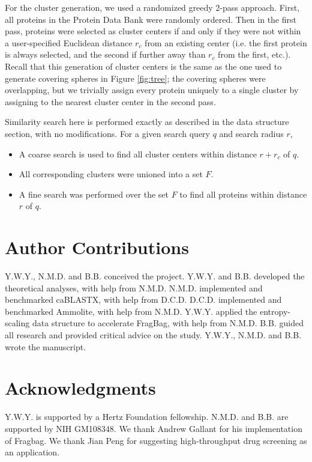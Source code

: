 \documentclass[review,preprint,12pt]{elsarticle}
\theoremstyle{definition}
\theoremstyle{remark}
\numberwithin{equation}{section}
\begin{document}
For the cluster generation, we used a randomized greedy 2-pass approach.
First, all proteins in the Protein Data Bank were randomly ordered.
Then in the first pass, proteins were selected as cluster centers if and only if they were not within a user-specified Euclidean distance $r_c$ from an existing center (i.e. the first protein is always selected, and the second if further away than $r_c$ from the first, etc.).
Recall that this generation of cluster centers is the same as the one used to generate covering spheres in Figure \ref{fig:tree};
the covering spheres were overlapping, but we trivially assign every protein uniquely to a single cluster by assigning to the nearest cluster center in the second pass.

Similarity search here is performed exactly as described in the data structure section, with no modifications.
For a given search query $q$ and search radius $r$,
\begin{itemize}
    \item A coarse search is used to find all cluster centers within distance $r+r_c$ of $q$.
    \item All corresponding clusters were unioned into a set $F$.
    \item A fine search was performed over the set $F$ to find all proteins within distance $r$ of $q$.
\end{itemize}

\section{Author Contributions}
Y.W.Y., N.M.D. and B.B. conceived the project.
Y.W.Y. and B.B. developed the theoretical analyses, with help from N.M.D.
N.M.D. implemented and benchmarked caBLASTX, with help from D.C.D.
D.C.D. implemented and benchmarked Ammolite, with help from N.M.D.
Y.W.Y. applied the entropy-scaling data structure to accelerate FragBag, with help from N.M.D.
B.B. guided all research and provided critical advice on the study.
Y.W.Y., N.M.D. and B.B. wrote the manuscript.

\section{Acknowledgments}
Y.W.Y. is supported by a Hertz Foundation fellowship.
N.M.D. and B.B. are supported by NIH GM108348.
We thank Andrew Gallant for his implementation of Fragbag.
We thank Jian Peng for suggesting high-throughput drug screening as an application.


%

\end{document}
